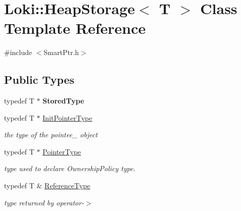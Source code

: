 \hypertarget{classLoki_1_1HeapStorage}{}\section{Loki\+:\+:Heap\+Storage$<$ T $>$ Class Template Reference}
\label{classLoki_1_1HeapStorage}


{\ttfamily \#include $<$Smart\+Ptr.\+h$>$}

\subsection*{Public Types}
\begin{DoxyCompactItemize}
\item 
\hypertarget{classLoki_1_1HeapStorage_a537a18f875c7346a4f8eb3d9445ce8c0}{}typedef T $\ast$ {\bfseries Stored\+Type}\label{classLoki_1_1HeapStorage_a537a18f875c7346a4f8eb3d9445ce8c0}

\item 
\hypertarget{classLoki_1_1HeapStorage_a533bd38c232cba5193b2588f868cd3e7}{}typedef T $\ast$ \hyperlink{classLoki_1_1HeapStorage_a533bd38c232cba5193b2588f868cd3e7}{Init\+Pointer\+Type}\label{classLoki_1_1HeapStorage_a533bd38c232cba5193b2588f868cd3e7}

\begin{DoxyCompactList}\small\item\em the type of the pointee\+\_\+ object \end{DoxyCompactList}\item 
\hypertarget{classLoki_1_1HeapStorage_a11ad403d98af5c6671f47d433d67201d}{}typedef T $\ast$ \hyperlink{classLoki_1_1HeapStorage_a11ad403d98af5c6671f47d433d67201d}{Pointer\+Type}\label{classLoki_1_1HeapStorage_a11ad403d98af5c6671f47d433d67201d}

\begin{DoxyCompactList}\small\item\em type used to declare Ownership\+Policy type. \end{DoxyCompactList}\item 
\hypertarget{classLoki_1_1HeapStorage_a3fee3ebeb24babac70bd87cbe8006e99}{}typedef T \& \hyperlink{classLoki_1_1HeapStorage_a3fee3ebeb24babac70bd87cbe8006e99}{Reference\+Type}\label{classLoki_1_1HeapStorage_a3fee3ebeb24babac70bd87cbe8006e99}

\begin{DoxyCompactList}\small\item\em type returned by operator-\/$>$ \end{DoxyCompactList}\end{DoxyCompactItemize}

